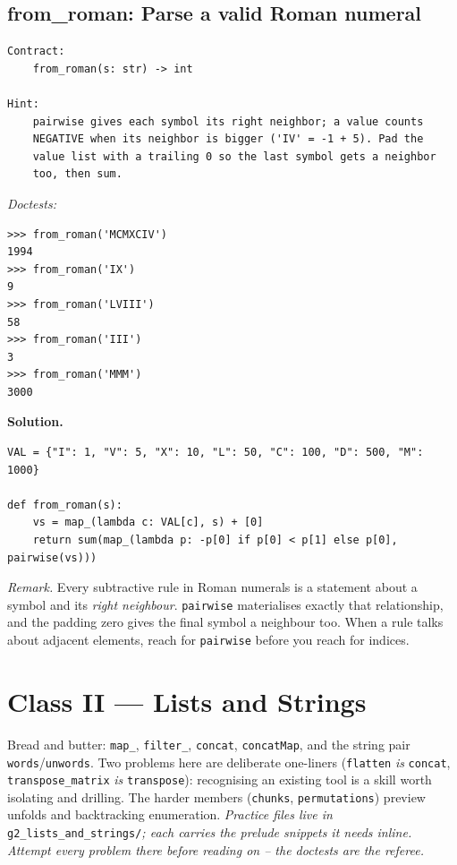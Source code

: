 \documentclass[11pt,letterpaper]{book}
\begin{document}
\section{from\_roman: Parse a valid Roman numeral}
\begin{lstlisting}[style=spec]
Contract:
    from_roman(s: str) -> int

Hint:
    pairwise gives each symbol its right neighbor; a value counts
    NEGATIVE when its neighbor is bigger ('IV' = -1 + 5). Pad the
    value list with a trailing 0 so the last symbol gets a neighbor
    too, then sum.
\end{lstlisting}
\noindent\textit{Doctests:}
\begin{lstlisting}[style=spec]
>>> from_roman('MCMXCIV')
1994
>>> from_roman('IX')
9
>>> from_roman('LVIII')
58
>>> from_roman('III')
3
>>> from_roman('MMM')
3000
\end{lstlisting}
\noindent\textbf{Solution.}
\begin{lstlisting}[style=code]
VAL = {"I": 1, "V": 5, "X": 10, "L": 50, "C": 100, "D": 500, "M": 1000}

def from_roman(s):
    vs = map_(lambda c: VAL[c], s) + [0]
    return sum(map_(lambda p: -p[0] if p[0] < p[1] else p[0], pairwise(vs)))
\end{lstlisting}

\noindent\textit{Remark.} Every subtractive rule in Roman numerals is a statement about
a symbol and its \emph{right neighbour}. \texttt{pairwise} materialises exactly
that relationship, and the padding zero gives the final symbol a neighbour too.
When a rule talks about adjacent elements, reach for \texttt{pairwise} before you
reach for indices.
\chapter{Class II --- Lists and Strings}

Bread and butter: \texttt{map\_}, \texttt{filter\_}, \texttt{concat},
\texttt{concatMap}, and the string pair \texttt{words}/\texttt{unwords}. Two
problems here are deliberate one-liners (\texttt{flatten} \emph{is}
\texttt{concat}, \texttt{transpose\_matrix} \emph{is} \texttt{transpose}):
recognising an existing tool is a skill worth isolating and drilling. The
harder members (\texttt{chunks}, \texttt{permutations}) preview unfolds and
backtracking enumeration.
\medskip\noindent\textit{Practice files live in }\texttt{g2\_lists\_and\_strings/}\textit{;
each carries the prelude snippets it needs inline. Attempt every problem there
before reading on -- the doctests are the referee.}
\end{document}
